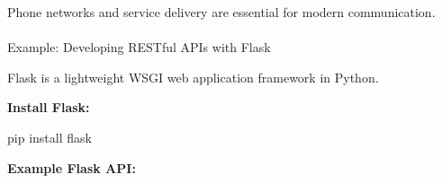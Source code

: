\documentclass[
  letterpaper,
  DIV=11,
  numbers=noendperiod]{scrreprt}
\makeatletter
\let\oldparagraph\paragraph
\renewcommand{\paragraph}{
    \@ifstar
      \xxxParagraphStar
      \xxxParagraphNoStar
  }
\newcommand{\xxxParagraphStar}[1]{\oldparagraph*{#1}\mbox{}}
\newcommand{\xxxParagraphNoStar}[1]{\oldparagraph{#1}\mbox{}}
\newenvironment{Shaded}{\begin{snugshade}}{\end{snugshade}}
\newcommand{\ExtensionTok}[1]{\textcolor[rgb]{0.00,0.23,0.31}{#1}}
\newcommand{\NormalTok}[1]{\textcolor[rgb]{0.00,0.23,0.31}{#1}}
\makeatother
\begin{document}
Phone networks and service delivery are essential for modern
communication.

\paragraph{Example: Developing RESTful APIs with
Flask}\label{example-developing-restful-apis-with-flask}

Flask is a lightweight WSGI web application framework in Python.

\textbf{Install Flask:}

\begin{Shaded}
\begin{Highlighting}[]
\ExtensionTok{pip}\NormalTok{ install flask}
\end{Highlighting}
\end{Shaded}

\textbf{Example Flask API:}
\end{document}
